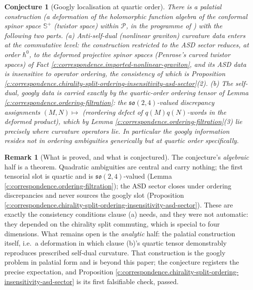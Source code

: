 \documentclass[11pt]{article}
\newtheorem{conjecture}[theorem]{Conjecture}
\theoremstyle{definition}
\newtheorem{remark}[theorem]{Remark}
\theoremstyle{plain}
\newcommand{\changedmark}[2]{\marginpar{\raggedright\scriptsize\color{#1}#2}}
\providecommand{\CS}{}\renewcommand{\CS}{{\mathbb{S}^{+}}}
\begin{document}
\begin{conjecture}[Googly localisation at quartic order]\label{c:correspondence.googly-localisation-quartic-order}
\changedmark{gray}{reworded}
There is a palatial construction (a deformation of the holomorphic function algebra of the conformal spinor space $\CS$ (twistor space) within $\mathcal{P}$, in the programme of \cite{Penrose15}) with the following two parts. \emph{(a)} Anti-self-dual (nonlinear graviton) curvature data enters at the commutative level: the construction restricted to the ASD sector reduces, at order $\hbar^0$, to the deformed projective spinor spaces (Penrose's curved twistor spaces) of Fact \ref{c:correspondence.imported-nonlinear-graviton}, and its ASD data is insensitive to operator ordering, the consistency of which is Proposition \ref{c:correspondence.chirality-split-ordering-insensitivity-asd-sector}(2). \emph{(b)} The self-dual, googly data is carried \emph{exactly} by the quartic-order ordering tensor of Lemma \ref{c:correspondence.ordering-filtration}: the $\mathfrak{so}(2,4)$-valued discrepancy assignments $(M, N) \mapsto$ (reordering defect of $q(M)q(N)$-words in the deformed product), which by Lemma \ref{c:correspondence.ordering-filtration}(3) lie precisely where curvature operators lie. In particular the googly information resides not in ordering ambiguities generically but at quartic order specifically.
\end{conjecture}

\begin{remark}[What is proved, and what is conjectured]\label{c:note.correspondence.what-proved-what-conjectured}
The conjecture's \emph{algebraic} half is a theorem. Quadratic ambiguities are central and carry nothing; the first tensorial slot is quartic and is $\mathfrak{so}(2,4)$-valued (Lemma \ref{c:correspondence.ordering-filtration}); the ASD sector closes under ordering discrepancies and never sources the googly slot (Proposition \ref{c:correspondence.chirality-split-ordering-insensitivity-asd-sector}). These are exactly the consistency conditions clause (a) needs, and they were not automatic: they depended on the chirality split commuting, which is special to four dimensions. What remains open is the \emph{analytic} half: the palatial construction itself, i.e.\ a deformation in which clause (b)'s quartic tensor demonstrably reproduces prescribed self-dual curvature. That construction is the googly problem in palatial form and is beyond this paper; the conjecture registers the precise expectation, and Proposition \ref{c:correspondence.chirality-split-ordering-insensitivity-asd-sector} is its first falsifiable check, passed.
\end{remark}
\end{document}
